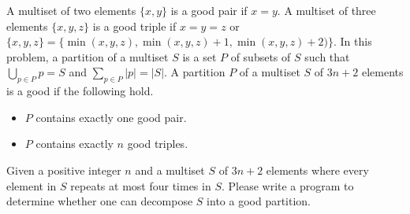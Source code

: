 A multiset of two elements $\{x, y\}$ is a good pair if $x=y$.
A multiset of three elements $\{x,y,z\}$ is a good triple 
if $x=y=z$ or $\{x,y,z\} = \{\min(x,y,z),\min(x,y,z)+1,\min(x,y,z)+2)\}$.
In this problem, 
a partition of a multiset $S$ is a set $P$ of subsets of $S$ such that
$\bigcup_{p\in P}p = S$ and $\sum_{p\in P}|p| = |S|$.
A partition $P$ of a multiset $S$ of $3n+2$ elements is a good if 
the following hold.
\begin{itemize}
\item $P$ contains exactly one good pair.
\item $P$ contains exactly $n$ good triples.
\end{itemize}

Given a positive integer $n$ and a multiset $S$ of $3n+2$ elements where
every element in $S$ repeats at most four times in $S$.
Please write a program to determine whether one can decompose $S$ 
into a good partition.
